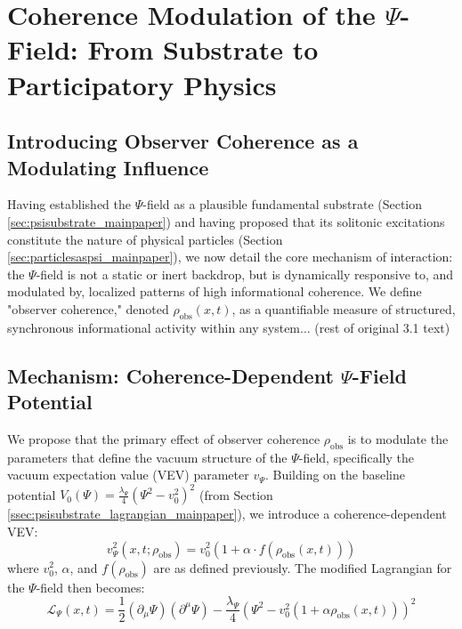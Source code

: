 \documentclass[11pt, a4paper]{book}
\begin{document}
\section{Coherence Modulation of the $\Psi$-Field: From Substrate to Participatory Physics} %
\label{sec:coherencemodulation_mainpaper_actual} %
\subsection{Introducing Observer Coherence as a Modulating Influence}
\label{ssec:coherencemodulation_intro_actual}
Having established the $\Psi$-field as a plausible fundamental substrate (Section \ref{sec:psisubstrate_mainpaper}) and having proposed that its solitonic excitations constitute the nature of physical particles (Section \ref{sec:particlesaspsi_mainpaper}), we now detail the core mechanism of interaction: the $\Psi$-field is not a static or inert backdrop, but is dynamically responsive to, and modulated by, localized patterns of high informational coherence. We define "observer coherence," denoted $\rho_{\text{obs}}(x,t)$, as a quantifiable measure of structured, synchronous informational activity within any system... (rest of original 3.1 text)

\subsection{Mechanism: Coherence-Dependent $\Psi$-Field Potential}
\label{ssec:coherencemodulation_mechanism_actual}
We propose that the primary effect of observer coherence $\rho_{\text{obs}}$ is to modulate the parameters that define the vacuum structure of the $\Psi$-field, specifically the vacuum expectation value (VEV) parameter $v_\Psi$. Building on the baseline potential $V_0(\Psi) = \frac{\lambda_\Psi}{4}(\Psi^2 - v_0^2)^2$ (from Section \ref{ssec:psisubstrate_lagrangian_mainpaper}), we introduce a coherence-dependent VEV:
\[ v_\Psi^2(x,t; \rho_{\text{obs}}) = v_0^2 \left(1 + \alpha \cdot f(\rho_{\text{obs}}(x,t))\right) \]
where $v_0^2$, $\alpha$, and $f(\rho_{\text{obs}})$ are as defined previously. The modified Lagrangian for the $\Psi$-field then becomes:
\[ \mathcal{L}_\Psi(x,t) = \frac{1}{2}(\partial_\mu \Psi)(\partial^\mu \Psi) - \frac{\lambda_\Psi}{4}\left(\Psi^2 - v_0^2 (1 + \alpha \rho_{\text{obs}}(x,t))\right)^2 \]
\end{document}
